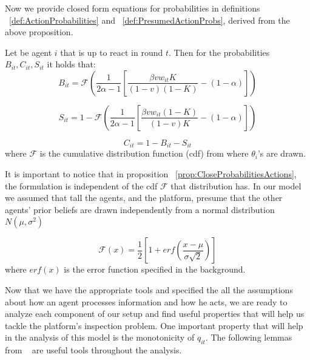 Now we provide closed form equations for probabilities in definitions ~\ref{def:ActionProbabilities} and ~\ref{def:PresumedActionProbs}, derived from the above proposition.
\begin{prop}
	Let be agent $i$ that is up to react in round $t$. Then for the probabilities $B_{it},C_{it},S_{it}$ it holds that:
	$$B_{it} = \mathcal{F} \left( \displaystyle\frac{1}{2\alpha-1}\left[\frac{\beta v w_{it} K}{(1-v)(1-K)}-(1-\alpha)\right] \right)$$

	$$S_{it} = 1-\mathcal{F} \left( \displaystyle\frac{1}{2\alpha-1}\left[\frac{\beta v w_{it} (1-K)}{(1-v)K}-(1-\alpha)\right] \right)$$  
	
	$$C_{it} = 1-B_{it}-S_{it}$$
where $\mathcal{F}$ is the cumulative distribution function (cdf) from where $\theta_i$'s are drawn. 
\label{prop:CloseProbabilitiesActions}
\end{prop}

It is important to notice that in proposition ~\ref{prop:CloseProbabilitiesActions}, the formulation is independent of the cdf $\mathcal{F}$ that distribution has. In our model we assumed that tall the agents, and the platform, presume that the other agents' prior beliefs are drawn independently from a normal distribution $N(\mu,\sigma^2)$

$$\mathcal{F}(x) = \frac{1}{2} \left[1+erf\left(\frac{x-\mu}{\sigma \sqrt{2}}\right)\right]$$
where $erf(x)$ is the error function specified in the background.

Now that we have the appropriate tools and specified the all the assumptions about how an agent processes information and how he acts, we are ready to analyze each component of our setup and find useful properties that will help us tackle the platform's inspection problem. One important property that will help in the analysis of this model is the monotonicity of $q_{it}$. The following lemmas from ~\cite{papanastasiou} are useful tools throughout the analysis.

